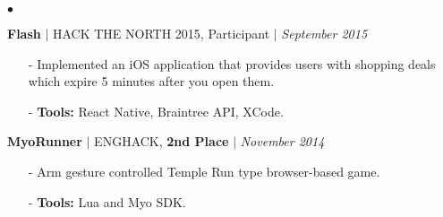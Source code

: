 \documentclass[11pt]{article}
\newenvironment{achievements}{\begin{list}{$\bullet$}{\topsep 0pt \itemsep -1.5pt \leftmargin 5pt}}{\vspace*{4pt}\end{list}}
\begin{document}
\begin{achievements}
\vspace{3pt}

\item \textbf{Flash} {$|$ \scriptsize HACK THE NORTH 2015, Participant} $|$  \href{https://github.com/nakulpathak3/Flash}{\faGithub} \hfill \textit {September 2015}
\begin{itemize}
\item[-] Implemented an iOS application that provides users with shopping deals which expire 5 minutes after you open them.
\vspace{2pt}
\item[-] \textbf{Tools:} React Native, Braintree API, XCode.
\end{itemize}

\vspace{3pt}

\item\textbf{MyoRunner} {$|$ \scriptsize ENGHACK, \textbf{2nd Place} }  $|$  \href{https://github.com/nakulpathak3/myorunner}{\faGithub} \hfill \textit {November 2014}
\begin{itemize}
\item[-]Arm gesture controlled Temple Run type browser-based game.
\vspace{2pt}
\item[-]\textbf{Tools:} Lua and Myo SDK.
\end{itemize}




\end{achievements}
\end{document}
